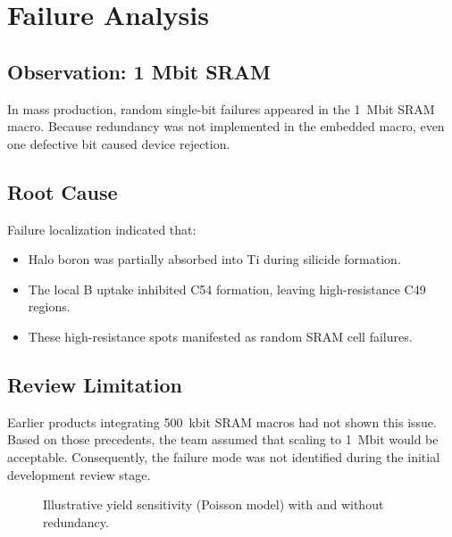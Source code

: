 \documentclass[conference]{IEEEtran}
\begin{document}
\section{Failure Analysis}
\subsection{Observation: 1 Mbit SRAM}
In mass production, random single-bit failures appeared in the 1~Mbit SRAM macro.
Because redundancy was not implemented in the embedded macro, even one defective bit caused device rejection.

\subsection{Root Cause}
Failure localization indicated that:
\begin{itemize}
  \item Halo boron was partially absorbed into Ti during silicide formation.
  \item The local B uptake inhibited C54 formation, leaving high-resistance C49 regions.
  \item These high-resistance spots manifested as random SRAM cell failures.
\end{itemize}

\subsection{Review Limitation}
Earlier products integrating 500~kbit SRAM macros had not shown this issue.
Based on those precedents, the team assumed that scaling to 1~Mbit would be acceptable.
Consequently, the failure mode was not identified during the initial development review stage.

\begin{figure}[t]
  \centering
  \caption{Illustrative yield sensitivity (Poisson model) with and without redundancy.}
  \label{fig:yield}
\end{figure}
\end{document}
